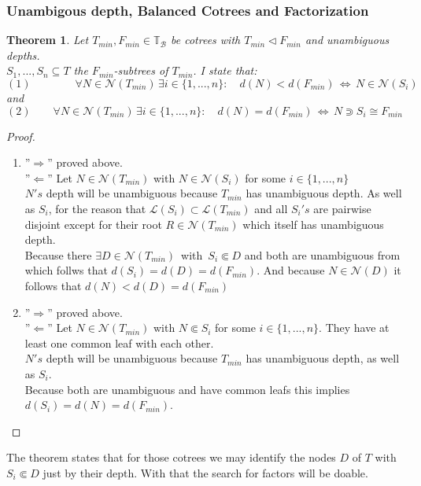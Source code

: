 \documentclass[a4paper,12pt]{article}
\newtheorem{theorem}{Theorem}[section]
\theoremstyle{definition}
\begin{document}
		\subsubsection{Unambigous depth, Balanced Cotrees and Factorization}
		\begin{theorem}
			Let $T_{min},F_{min}\in\mathds{T}_{\mathcal{B}}$ be cotrees with $T_{min}\vartriangleleft F_{min}$ and unambiguous depths.\\ $S_1,...,S_n\subseteq T$ the $F_{min}$-subtrees of $T_{min}$. I state that:
			\[(1)\qquad \qquad \forall N\in \mathcal{N}(T_{min})\, \exists i\in\{1,...,n\}:\quad d(N)<d(F_{min})\,\Longleftrightarrow\, N\in \mathcal{N}(S_i) \]
			and
			\[(2)\qquad \forall N\in \mathcal{N}(T_{min})\, \exists i\in\{1,...,n\}:\quad d(N)= d(F_{min})\,\Longleftrightarrow\, N \Supset S_i\cong F_{min} \]
		\end{theorem}
	\begin{proof}
		\begin{enumerate}[(1)]
			\item ''$\Rightarrow$'' proved above.\\
			''$\Leftarrow$'' Let $N\in\mathcal{N}(T_{min})$ with $N\in \mathcal{N}(S_i)$ for some $i\in\{1,...,n\}$\\
			$N's$ depth will be unambiguous because $T_{min}$ has unambiguous depth. As well as $S_i$, for the reason that $\mathcal{L}(S_i)\subset \mathcal{L}(T_{min})$ and all $S_i's$ are pairwise disjoint except for their root $R\in \mathcal{N}(T_{min})$ which itself has unambiguous depth.\\
			Because there $\exists D\in \mathcal{N}(T_{min})\,  $ with $\,S_i\Subset D$ and both are unambiguous from which follws that $d(S_i)=d(D)=d(F_{min})$. And because $N\in \mathcal{N}(D)$ it follows that $d(N)< d(D)=d(F_{min})$ 
			\item ''$\Rightarrow$'' proved above.\\
			''$\Leftarrow$'' Let $N\in\mathcal{N}(T_{min})$ with $N \Subset S_i$ for some $i\in\{1,...,n\}$. They have at least one common leaf with each other.\\
			$N's$ depth will be unambiguous because $T_{min}$ has unambiguous depth, as well as $S_i$.\\
			Because both are unambiguous and have common leafs this implies $d(S_i)=d(N)=d(F_{min})$.
		\end{enumerate}
	\end{proof}
		The theorem states that for those cotrees we may identify the nodes $D$ of $T$ with $S_i \Subset D$ just by their depth. With that the search for factors will be doable.\\
\end{document}
